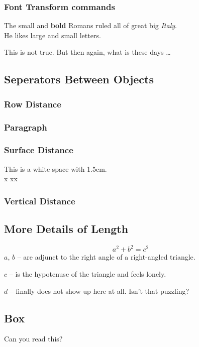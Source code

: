 \documentclass[a4paper,11pt]{article}
\begin{document}
\subsubsection{Font Transform commands}
{
    \small The small and
    \textbf{bold} Romans ruled
}
{
    \Large all of great big
    \textit{Italy}.
}\\

He likes
{
  \Large large and \small small  
} letters.
\begin{Large}
    This is not true.
    But then again, what is these
    days \ldots
\end{Large}
\subsection{Seperators Between Objects}
\subsubsection{Row Distance}
\subsubsection{Paragraph}
\subsubsection{Surface Distance}
This is \hspace{1.5cm} a white space with 1.5cm.\\
x
xx
\subsubsection{Vertical Distance}
\subsection{More Details of Length}
\begin{flushleft}
    \newenvironment{vardesc}[1]{
        \settowidth{\parindent}{#1: \ }
        \makebox[0pt][r]{#1: \ }}{}
    \begin{displaymath}
        a^2+b^2=c^2
    \end{displaymath}
    \begin{vardesc}{Where}$a$,
    $b$ -- are adjunct to the right angle of a 
    right-angled triangle.

    $c$ -- is the hypotenuse of the triangle
    and feels lonely.

    $d$ -- finally does not show up here
    at all. Isn't that puzzling?
    \end{vardesc}
\end{flushleft}
\subsection{Box}
\par
{}\par
{}\par
{} \par
{}
Can you read this?
\end{document}
